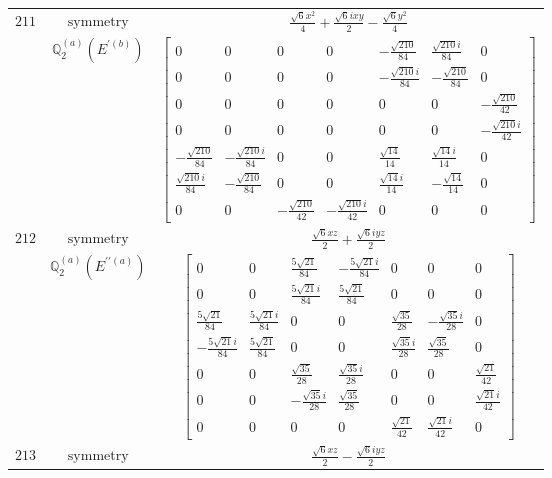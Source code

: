 \documentclass[fleqn,8pt,landscape]{jsarticle}
\begin{document}
\begin{longtable}{ccc}
$ 211 $ & $ \text{symmetry} $ & $ \frac{\sqrt{6} x^{2}}{4} + \frac{\sqrt{6} i x y}{2} - \frac{\sqrt{6} y^{2}}{4} $ \\
$  $ & $ \mathbb{Q}_{2}^{(a)}(E^{\prime(b)}) $ & $ \begin{bmatrix} 0 & 0 & 0 & 0 & - \frac{\sqrt{210}}{84} & \frac{\sqrt{210} i}{84} & 0 \\ 0 & 0 & 0 & 0 & - \frac{\sqrt{210} i}{84} & - \frac{\sqrt{210}}{84} & 0 \\ 0 & 0 & 0 & 0 & 0 & 0 & - \frac{\sqrt{210}}{42} \\ 0 & 0 & 0 & 0 & 0 & 0 & - \frac{\sqrt{210} i}{42} \\ - \frac{\sqrt{210}}{84} & - \frac{\sqrt{210} i}{84} & 0 & 0 & \frac{\sqrt{14}}{14} & \frac{\sqrt{14} i}{14} & 0 \\ \frac{\sqrt{210} i}{84} & - \frac{\sqrt{210}}{84} & 0 & 0 & \frac{\sqrt{14} i}{14} & - \frac{\sqrt{14}}{14} & 0 \\ 0 & 0 & - \frac{\sqrt{210}}{42} & - \frac{\sqrt{210} i}{42} & 0 & 0 & 0 \end{bmatrix} $ \\ \hline
$ 212 $ & $ \text{symmetry} $ & $ \frac{\sqrt{6} x z}{2} + \frac{\sqrt{6} i y z}{2} $ \\
$  $ & $ \mathbb{Q}_{2}^{(a)}(E^{\prime\prime(a)}) $ & $ \begin{bmatrix} 0 & 0 & \frac{5 \sqrt{21}}{84} & - \frac{5 \sqrt{21} i}{84} & 0 & 0 & 0 \\ 0 & 0 & \frac{5 \sqrt{21} i}{84} & \frac{5 \sqrt{21}}{84} & 0 & 0 & 0 \\ \frac{5 \sqrt{21}}{84} & \frac{5 \sqrt{21} i}{84} & 0 & 0 & \frac{\sqrt{35}}{28} & - \frac{\sqrt{35} i}{28} & 0 \\ - \frac{5 \sqrt{21} i}{84} & \frac{5 \sqrt{21}}{84} & 0 & 0 & \frac{\sqrt{35} i}{28} & \frac{\sqrt{35}}{28} & 0 \\ 0 & 0 & \frac{\sqrt{35}}{28} & \frac{\sqrt{35} i}{28} & 0 & 0 & \frac{\sqrt{21}}{42} \\ 0 & 0 & - \frac{\sqrt{35} i}{28} & \frac{\sqrt{35}}{28} & 0 & 0 & \frac{\sqrt{21} i}{42} \\ 0 & 0 & 0 & 0 & \frac{\sqrt{21}}{42} & \frac{\sqrt{21} i}{42} & 0 \end{bmatrix} $ \\ \hline
$ 213 $ & $ \text{symmetry} $ & $ \frac{\sqrt{6} x z}{2} - \frac{\sqrt{6} i y z}{2} $ \\

\end{longtable}
\end{document}
